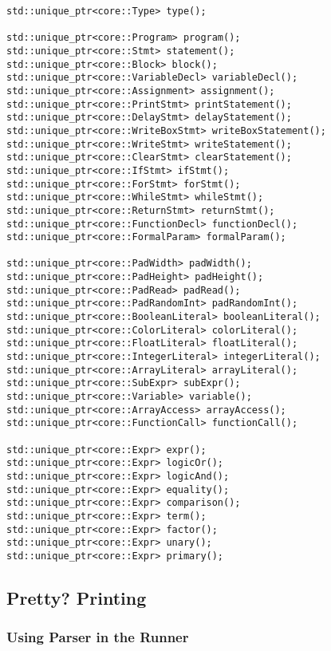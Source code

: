 \begin{lstlisting}[caption={The main body of methods in the
Parser class (parser/Parser.hpp)}, label=lst:methodslist]
std::unique_ptr<core::Type> type();

std::unique_ptr<core::Program> program();
std::unique_ptr<core::Stmt> statement();
std::unique_ptr<core::Block> block();
std::unique_ptr<core::VariableDecl> variableDecl();
std::unique_ptr<core::Assignment> assignment();
std::unique_ptr<core::PrintStmt> printStatement();
std::unique_ptr<core::DelayStmt> delayStatement();
std::unique_ptr<core::WriteBoxStmt> writeBoxStatement();
std::unique_ptr<core::WriteStmt> writeStatement();
std::unique_ptr<core::ClearStmt> clearStatement();
std::unique_ptr<core::IfStmt> ifStmt();
std::unique_ptr<core::ForStmt> forStmt();
std::unique_ptr<core::WhileStmt> whileStmt();
std::unique_ptr<core::ReturnStmt> returnStmt();
std::unique_ptr<core::FunctionDecl> functionDecl();
std::unique_ptr<core::FormalParam> formalParam();

std::unique_ptr<core::PadWidth> padWidth();
std::unique_ptr<core::PadHeight> padHeight();
std::unique_ptr<core::PadRead> padRead();
std::unique_ptr<core::PadRandomInt> padRandomInt();
std::unique_ptr<core::BooleanLiteral> booleanLiteral();
std::unique_ptr<core::ColorLiteral> colorLiteral();
std::unique_ptr<core::FloatLiteral> floatLiteral();
std::unique_ptr<core::IntegerLiteral> integerLiteral();
std::unique_ptr<core::ArrayLiteral> arrayLiteral();
std::unique_ptr<core::SubExpr> subExpr();
std::unique_ptr<core::Variable> variable();
std::unique_ptr<core::ArrayAccess> arrayAccess();
std::unique_ptr<core::FunctionCall> functionCall();

std::unique_ptr<core::Expr> expr();
std::unique_ptr<core::Expr> logicOr();
std::unique_ptr<core::Expr> logicAnd();
std::unique_ptr<core::Expr> equality();
std::unique_ptr<core::Expr> comparison();
std::unique_ptr<core::Expr> term();
std::unique_ptr<core::Expr> factor();
std::unique_ptr<core::Expr> unary();
std::unique_ptr<core::Expr> primary();
\end{lstlisting}

\subsection{Pretty? Printing}

\subsubsection{Using Parser in the Runner}

